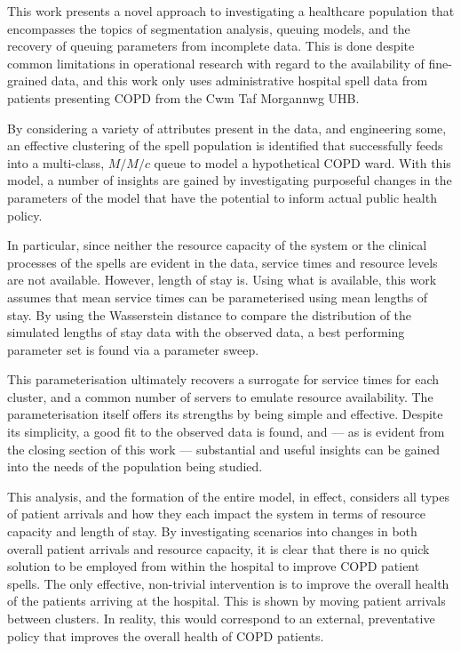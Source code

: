 \documentclass[11pt]{article}
\begin{document}
This work presents a novel approach to investigating a healthcare population
that encompasses the topics of segmentation analysis, queuing models, and the
recovery of queuing parameters from incomplete data. This is done despite common
limitations in operational research with regard to the availability of
fine-grained data, and this work only uses administrative hospital spell data
from patients presenting COPD from the Cwm Taf Morgannwg UHB.\

By considering a variety of attributes present in the data, and engineering
some, an effective clustering of the spell population is identified that
successfully feeds into a multi-class, \(M/M/c\) queue to model a hypothetical
COPD ward. With this model, a number of insights are gained by investigating
purposeful changes in the parameters of the model that have the potential to
inform actual public health policy.

In particular, since neither the resource capacity of the system or the clinical
processes of the spells are evident in the data, service times and resource
levels are not available. However, length of stay is. Using what is available,
this work assumes that mean service times can be parameterised using mean
lengths of stay. By using the Wasserstein distance to compare the distribution
of the simulated lengths of stay data with the observed data, a best performing
parameter set is found via a parameter sweep.

This parameterisation ultimately recovers a surrogate for service times for each
cluster, and a common number of servers to emulate resource availability. The
parameterisation itself offers its strengths by being simple and effective.
Despite its simplicity, a good fit to the observed data is found, and --- as is
evident from the closing section of this work --- substantial and useful
insights can be gained into the needs of the population being studied.

This analysis, and the formation of the entire model, in effect, considers all
types of patient arrivals and how they each impact the system in terms of
resource capacity and length of stay. By investigating scenarios into changes in
both overall patient arrivals and resource capacity, it is clear that there is
no quick solution to be employed from within the hospital to improve COPD
patient spells.  The only effective, non-trivial intervention is to improve the
overall health of the patients arriving at the hospital. This is shown by moving
patient arrivals between clusters. In reality, this would correspond to an
external, preventative policy that improves the overall health of COPD patients.
\end{document}
